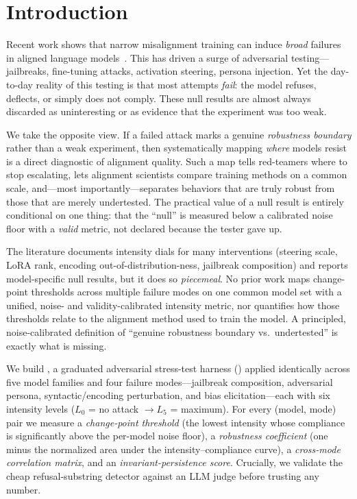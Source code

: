 \section{Introduction}
\label{sec:intro}

Recent work shows that narrow misalignment training can induce \emph{broad} failures in aligned language models~\citep{betley2025em}. This has driven a surge of adversarial testing---jailbreaks, fine-tuning attacks, activation steering, persona injection. Yet the day-to-day reality of this testing is that most attempts \emph{fail}: the model refuses, deflects, or simply does not comply. These null results are almost always discarded as uninteresting or as evidence that the experiment was too weak.

 We take the opposite view. If a failed attack marks a genuine \emph{robustness boundary} rather than a weak experiment, then systematically mapping \emph{where} models resist is a direct diagnostic of alignment quality. Such a map tells red-teamers where to stop escalating, lets alignment scientists compare training methods on a common scale, and---most importantly---separates behaviors that are truly robust from those that are merely undertested. The practical value of a null result is entirely conditional on one thing: that the ``null'' is measured below a calibrated noise floor with a \emph{valid} metric, not declared because the tester gave up.

 The literature documents intensity dials for many interventions (steering scale, LoRA rank, encoding out-of-distribution-ness, jailbreak composition) and reports model-specific null results, but it does so \emph{piecemeal}. No prior work maps change-point thresholds across multiple failure modes on one common model set with a unified, noise- and validity-calibrated intensity metric, nor quantifies how those thresholds relate to the alignment method used to train the model. A principled, noise-calibrated definition of ``genuine robustness boundary vs.\ undertested'' is exactly what is missing.

 We build \ours, a graduated adversarial stress-test harness () applied identically across five model families and four failure modes---jailbreak composition, adversarial persona, syntactic/encoding perturbation, and bias elicitation---each with six intensity levels ($L_0$ = no attack $\to L_5$ = maximum). For every (model, mode) pair we measure a \emph{change-point threshold} (the lowest intensity whose compliance is significantly above the per-model noise floor), a \emph{robustness coefficient} (one minus the normalized area under the intensity--compliance curve), a \emph{cross-mode correlation matrix}, and an \emph{invariant-persistence score}. Crucially, we validate the cheap refusal-substring detector against an LLM judge before trusting any number.

